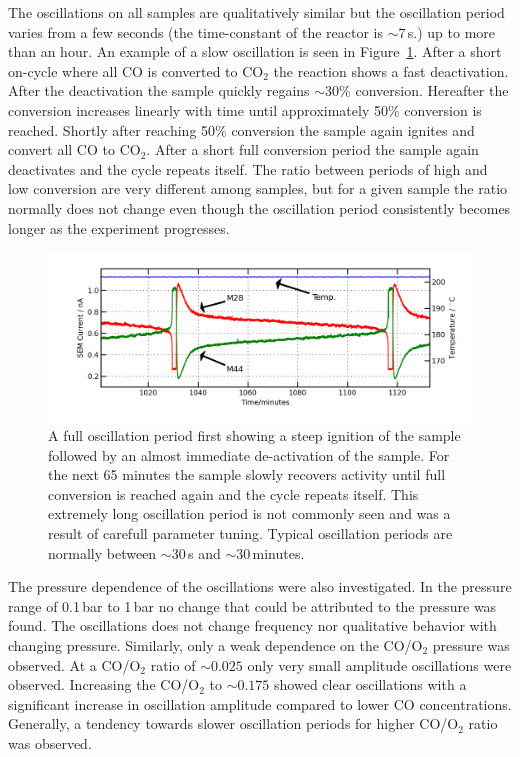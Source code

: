 \documentclass[8.5pt,twoside,twocolumn]{article}
\begin{document}
The oscillations on all samples are qualitatively similar but the oscillation period varies from a few seconds (the time-constant of the reactor is $\sim7\,$s.) up to more than an hour. An example of a slow oscillation is seen in Figure~\ref{fgr:full_oscillation}. After a short on-cycle where all CO is converted to CO$_2$ the reaction shows a fast deactivation. After the deactivation the sample quickly regains $\sim$30\% conversion. Hereafter the conversion increases linearly with time until approximately 50\% conversion is reached. Shortly after reaching 50\% conversion the sample again ignites and convert all CO to CO$_2$. After a short full conversion period the sample again deactivates and the cycle repeats itself. The ratio between periods of high and low conversion are very different among samples, but for a given sample the ratio normally does not change even though the oscillation period consistently becomes longer as the experiment progresses.
\begin{figure}
  \centering
  \includegraphics[width=17cm]{single_full_oscillation.png}
  \caption{A full oscillation period first showing a steep ignition of the sample followed by an almost immediate de-activation of the sample. For the next 65 minutes the sample slowly recovers activity until full conversion is reached again and the cycle repeats itself. This extremely long oscillation period is not commonly seen and was a result of carefull parameter tuning. Typical oscillation periods are normally between $\sim$30\,s and $\sim$30\,minutes.}
  \label{fgr:full_oscillation}
\end{figure}

The pressure dependence of the oscillations were also investigated. In the pressure range of 0.1\,bar to 1\,bar no change that could be attributed to the pressure was found. The oscillations does not change frequency nor qualitative behavior with changing pressure. Similarly, only a weak dependence on the CO/O$_2$ pressure was observed. At a CO/O$_2$ ratio of $\sim0.025$ only very small amplitude oscillations were observed. Increasing the CO/O$_2$ to $\sim0.175$ showed clear oscillations with a significant increase in oscillation amplitude compared to lower CO concentrations. Generally, a tendency towards slower oscillation periods for higher CO/O$_2$ ratio was observed.
\end{document}
